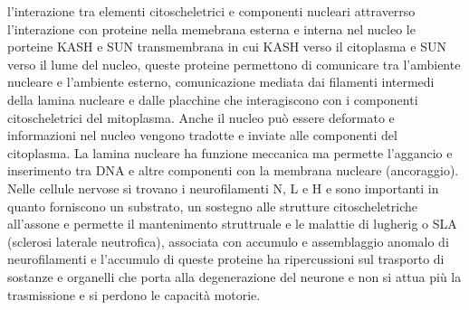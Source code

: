 l'interazione tra elementi citoscheletrici e componenti nucleari attraverrso l'interazione con proteine nella memebrana esterna e interna nel nucleo le porteine KASH e SUN transmembrana 
in cui KASH verso il citoplasma e SUN verso il lume del nucleo, queste proteine permettono di comunicare tra l'ambiente nucleare e l'ambiente esterno, comunicazione mediata dai filamenti
intermedi della lamina nucleare e dalle placchine che interagiscono con i componenti citoscheletrici del mitoplasma. Anche il nucleo pu\`o essere deformato e informazioni nel nucleo 
vengono tradotte e inviate alle componenti del citoplasma. La lamina nucleare ha funzione meccanica ma permette l'aggancio e inserimento tra DNA e altre componenti con la membrana 
nucleare (ancoraggio). Nelle cellule nervose si trovano i neurofilamenti N, L e H e sono importanti in quanto forniscono un substrato, un sostegno alle strutture citoscheletriche 
all'assone e permette il mantenimento struttruale e le malattie di lugherig o SLA (sclerosi laterale neutrofica), associata con accumulo e assemblaggio anomalo di neurofilamenti e 
l'accumulo di queste proteine ha ripercussioni sul trasporto di sostanze e organelli che porta alla degenerazione del neurone e non si attua pi\`u la trasmissione e si perdono le 
capacit\`a motorie. 
